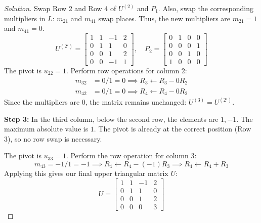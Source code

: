 \documentclass[11pt, a4paper]{article}
\newif\ifsolutionnewpage
\newenvironment{solution}
  {\begin{proof}[Solution]}
  {\end{proof}\ifsolutionnewpage\newpage\fi}
\begin{document}
\begin{solution}
    Swap Row 2 and Row 4 of $U^{(2)}$ and $P_1$. Also, swap the corresponding multipliers in $L$: $m_{21}$ and $m_{41}$ swap places. Thus, the new multipliers are $m_{21} = 1$ and $m_{41} = 0$.
    \[
    U^{(2')} = \begin{bmatrix} 1&1&-1&2 \\ 0&1&1&0 \\ 0&0&1&2 \\ 0&0&-1&1 \end{bmatrix}, \quad
    P_2 = \begin{bmatrix} 0&1&0&0 \\ 0&0&0&1 \\ 0&0&1&0 \\ 1&0&0&0 \end{bmatrix}
    \]
    The pivot is $u_{22} = 1$. Perform row operations for column 2:
    \begin{align*}
        m_{32} &= 0/1 = 0 \implies R_3 \leftarrow R_3 - 0 R_2 \\
        m_{42} &= 0/1 = 0 \implies R_4 \leftarrow R_4 - 0 R_2 
    \end{align*}
    Since the multipliers are $0$, the matrix remains unchanged: $U^{(3)} = U^{(2')}$.

    \textbf{Step 3:}
    In the third column, below the second row, the elements are $1, -1$. The maximum absolute value is $1$. The pivot is already at the correct position (Row 3), so no row swap is necessary.
    
    The pivot is $u_{33} = 1$. Perform the row operation for column 3:
    \[
    m_{43} = -1/1 = -1 \implies R_4 \leftarrow R_4 - (-1) R_3 \implies R_4 \leftarrow R_4 + R_3
    \]
    Applying this gives our final upper triangular matrix $U$:
    \[
    U = \begin{bmatrix} 1&1&-1&2 \\ 0&1&1&0 \\ 0&0&1&2 \\ 0&0&0&3 \end{bmatrix}
    \]


\end{solution}
\end{document}
